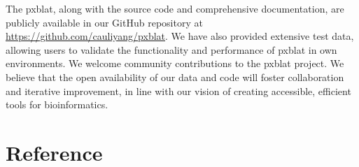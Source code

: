The \gls{pxblat}, along with the source code and comprehensive documentation, are publicly available in our GitHub repository at \url{https://github.com/cauliyang/pxblat}.
We have also provided extensive test data, allowing users to validate the functionality and performance of \gls{pxblat} in own environments.
We welcome community contributions to the \gls{pxblat} project.
We believe that the open availability of our data and code will foster collaboration and iterative improvement, in line with our vision of creating accessible, efficient tools for bioinformatics.

\section*{Reference}\label{sec:reference}



